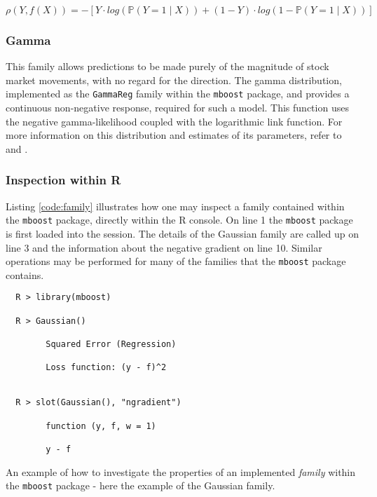 \documentclass{article}
\begin{document}
\begin{equation}
  \label{eqn-bin-error}
  \rho (Y, f(X)) = - \left[ Y \cdot log(\mathbb{P} (Y = 1 \mid X)) + (1-Y) \cdot log(1 - \mathbb{P} (Y = 1 \mid X)) \right]
\end{equation}



\subsubsection{Gamma}
\label{sec-5-6-3}

This family allows predictions to be made purely of the magnitude of stock market movements, with no regard for the direction. The gamma distribution, implemented as the \texttt{GammaReg} family within the \texttt{mboost} package, and provides a continuous non-negative response, required for such a model. This function uses the negative gamma-likelihood coupled with the logarithmic link function. For more information on this distribution and estimates of its parameters, refer to \cite{Hofner2012} and \cite{choi1969maximum}.


\subsubsection{Inspection within R}
\label{sec-5-6-4}

Listing \ref{code:family} illustrates how one may inspect a family contained within the \texttt{mboost} package, directly within the R console. On line 1 the \texttt{mboost} package is first loaded into the session. The details of the Gaussian family are called up on line 3 and the information about the negative gradient on line 10. Similar operations may be performed for many of the families that the \texttt{mboost} package contains.

\vspace{5mm}

\begin{listing}[H]
\begin{verbatim}
  R > library(mboost)

  R > Gaussian()

        Squared Error (Regression) 

        Loss function: (y - f)^2 


  R > slot(Gaussian(), "ngradient")

        function (y, f, w = 1) 
    
        y - f
\end{verbatim}
\caption[A guideline to inspecting the \texttt{mboost} Gaussian family]{\label{code:family}An example of how to investigate the properties of an implemented \emph{family} within the \texttt{mboost} package - here the example of the Gaussian family.}
\end{listing}
\end{document}
